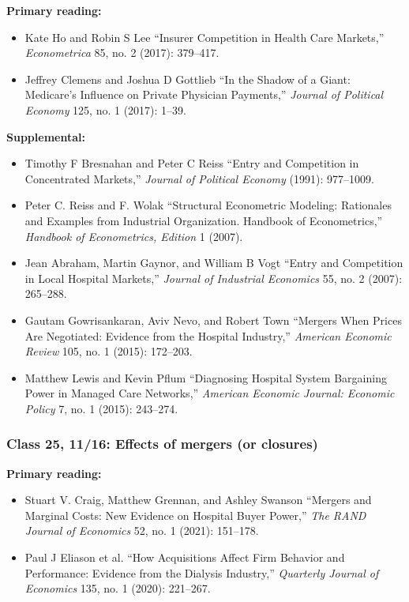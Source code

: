 \documentclass[11pt,]{article}
\providecommand{\tightlist}{%
  \setlength{\itemsep}{0pt}\setlength{\parskip}{0pt}}
\begin{document}
\textbf{Primary reading:}

\begin{itemize}
\tightlist
\item
  Kate Ho and Robin S Lee {``Insurer Competition in Health Care
  Markets,''} \emph{Econometrica} 85, no. 2 (2017): 379--417.
\item
  Jeffrey Clemens and Joshua D Gottlieb {``In the Shadow of a Giant:
  {Medicare}'s Influence on Private Physician Payments,''} \emph{Journal
  of Political Economy} 125, no. 1 (2017): 1--39.
\end{itemize}

\textbf{Supplemental:}

\begin{itemize}
\tightlist
\item
  Timothy F Bresnahan and Peter C Reiss {``Entry and Competition in
  Concentrated Markets,''} \emph{Journal of Political Economy} (1991):
  977--1009.
\item
  Peter C. Reiss and F. Wolak {``Structural Econometric Modeling:
  {Rationales} and Examples from Industrial Organization. {Handbook} of
  {Econometrics},''} \emph{Handbook of Econometrics, Edition} 1 (2007).
\item
  Jean Abraham, Martin Gaynor, and William B Vogt {``Entry and
  {Competition} in {Local} {Hospital} {Markets},''} \emph{Journal of
  Industrial Economics} 55, no. 2 (2007): 265--288.
\item
  Gautam Gowrisankaran, Aviv Nevo, and Robert Town {``Mergers {When}
  {Prices} {Are} {Negotiated}: {Evidence} from the {Hospital}
  {Industry},''} \emph{American Economic Review} 105, no. 1 (2015):
  172--203.
\item
  Matthew Lewis and Kevin Pflum {``Diagnosing {Hospital} {System}
  {Bargaining} {Power} in {Managed} {Care} {Networks},''} \emph{American
  Economic Journal: Economic Policy} 7, no. 1 (2015): 243--274.
\end{itemize}

\hypertarget{class-25-1116-effects-of-mergers-or-closures}{%
\subsubsection{Class 25, 11/16: Effects of mergers (or
closures)}\label{class-25-1116-effects-of-mergers-or-closures}}

\textbf{Primary reading:}

\begin{itemize}
\tightlist
\item
  Stuart V. Craig, Matthew Grennan, and Ashley Swanson {``Mergers and
  Marginal Costs: {New} Evidence on Hospital Buyer Power,''} \emph{The
  RAND Journal of Economics} 52, no. 1 (2021): 151--178.
\item
  Paul J Eliason et al. {``How {Acquisitions} {Affect} {Firm} {Behavior}
  and {Performance}: {Evidence} from the {Dialysis} {Industry},''}
  \emph{Quarterly Journal of Economics} 135, no. 1 (2020): 221--267.
\end{itemize}
\end{document}
